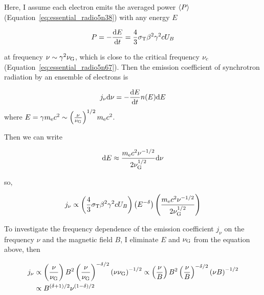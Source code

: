 Here, I assume each electron emits the averaged power $\left\langle P\right\rangle$ (Equation~\ref{eq:essential_radio5n38}) with any energy $E$

\begin{equation}\label{eq:essential_radio5n71}
    P=-\frac{\mathrm{d} E}{\mathrm{d} t}=\frac{4}{3} \sigma_{\mathrm{T}} \beta^2 \gamma^2 c U_B
\end{equation}

at frequency $\nu \sim \gamma^2\nu_{\mathrm{G}}$, which is close to the critical frequency $\nu_{\mathrm{c}}$ (Equation~\ref{eq:essential_radio5n67}).
Then the emission coefficient of synchrotron radiation by an ensemble of electrons is

\begin{equation}\label{eq:essential_radio5n73}
    j_{\nu} \mathrm{d} \nu=-\frac{\mathrm{d} E}{\mathrm{d} t} n(E) \mathrm{d} E
\end{equation}
where $E = \gamma m_{\mathrm{e}} c^2 \sim \left(\frac{\nu}{\nu_{\mathrm{G}}}\right)^{1/2} m_{\mathrm{e}}c^2$.

Then we can write

\begin{equation}\label{eq:essential_radio5n75}
    \mathrm{d} E \approx \frac{m_{\mathrm{e}} c^2 \nu^{-1 / 2}}{2 \nu_{\mathrm{G}}^{1 / 2}} \mathrm{d} \nu
\end{equation}

so,

\begin{equation}\label{eq:essential_radio5n76}
    j_{\nu} \propto\left(\frac{4}{3} \sigma_{\mathrm{T}} \beta^2 \gamma^2 c U_B\right)\left(E^{-\delta}\right)\left(\frac{m_{\mathrm{e}} c^2 \nu^{-1 / 2}}{2 \nu_{\mathrm{G}}^{1 / 2}}\right)
\end{equation}

To investigate the frequency dependence of the emission coefficient $j_{\nu}$ on the frequency $\nu$ and the magnetic field $B$, I eliminate  $E$ and $\nu_{\mathrm{G}}$ from the equation above, then

\begin{equation}\label{eq:essential_radio5n77}
    \begin{aligned}
        j_{\nu} & \propto \left(\frac{\nu}{\nu_{\mathrm{G}}}\right) B^2 \left(\frac{\nu}{\nu_{\mathrm{G}}}\right)^{-\delta / 2} \left(\nu \nu_{\mathrm{G}}\right)^{-1 / 2} \propto \left(\frac{\nu}{B}\right) B^2 \left(\frac{\nu}{B}\right)^{-\delta / 2} \left(\nu B\right)^{-1 / 2}\\
                & \propto B^{(\delta+1) / 2} \nu^{(1-\delta) / 2}
    \end{aligned}
\end{equation}

